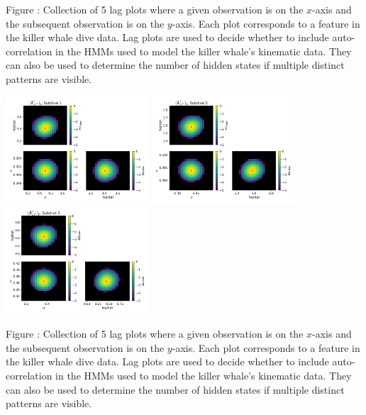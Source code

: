 \documentclass{article}
\begin{document}
        \noindent Figure : Collection of 5 lag plots where a given observation is on the $x$-axis and the subsequent observation is on the $y$-axis. Each plot corresponds to a feature in the killer whale dive data. Lag plots are used to decide whether to include auto-correlation in the HMMs used to model the killer whale's kinematic data. They can also be used to determine the number of hidden states if multiple distinct patterns are visible. 
        \addtocounter{fignum}{1}
        
        
        \begin{center}
        \includegraphics[width=2.1in]{../Plots/2019/20190902-182840-CATs_OB_1_0_267_CarHHMM2_fine-theta-likelihood-Ay-0.png}
        \includegraphics[width=2.1in]{../Plots/2019/20190902-182840-CATs_OB_1_0_267_CarHHMM2_fine-theta-likelihood-Ay-1.png}
        \includegraphics[width=2.1in]{../Plots/2019/20190902-182840-CATs_OB_1_0_267_CarHHMM2_fine-theta-likelihood-Ay-2.png}
        \end{center}
        
        \noindent Figure : Collection of 5 lag plots where a given observation is on the $x$-axis and the subsequent observation is on the $y$-axis. Each plot corresponds to a feature in the killer whale dive data. Lag plots are used to decide whether to include auto-correlation in the HMMs used to model the killer whale's kinematic data. They can also be used to determine the number of hidden states if multiple distinct patterns are visible. 
        \addtocounter{fignum}{1}
        
\end{document}
